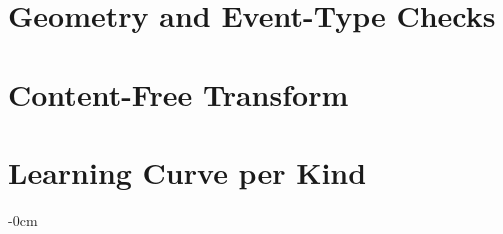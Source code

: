 \documentclass[sensors,article,submit,pdftex,oneauthor]{Definitions/mdpi}
\begin{document}
\section{Geometry and Event-Type Checks}
\label{app:typematched}



\section{Content-Free Transform}
\label{app:hardened}


\section{Learning Curve per Kind}
\label{app:learningcurve}


\begin{adjustwidth}{-\extralength}{0cm}


\PublishersNote{}
\end{adjustwidth}
\end{document}
